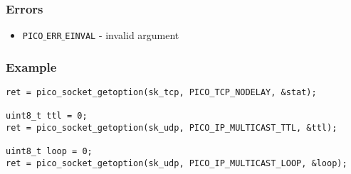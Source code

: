 \subsubsection*{Errors}
\begin{itemize}[noitemsep]
\item \texttt{PICO$\_$ERR$\_$EINVAL} - invalid argument
\end{itemize}

\subsubsection*{Example}
\begin{verbatim}
ret = pico_socket_getoption(sk_tcp, PICO_TCP_NODELAY, &stat);

uint8_t ttl = 0;
ret = pico_socket_getoption(sk_udp, PICO_IP_MULTICAST_TTL, &ttl);

uint8_t loop = 0;
ret = pico_socket_getoption(sk_udp, PICO_IP_MULTICAST_LOOP, &loop);
\end{verbatim}